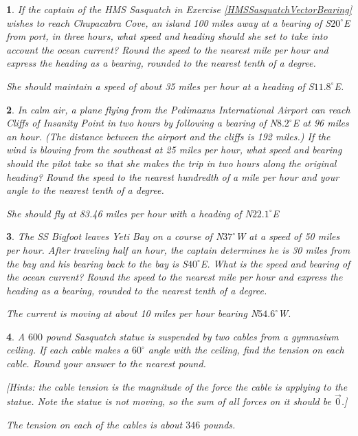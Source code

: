 \documentclass{amsbook}
\newtheorem{exc}{}
\newenvironment{ex}{\begin{exc}\normalfont}{\end{exc}}
\numberwithin{section}{chapter}
\numberwithin{equation}{chapter}
\begin{document}
\begin{ex}
	If the captain of the HMS Sasquatch in Exercise \ref{HMSSasquatchVectorBearing} wishes to reach Chupacabra Cove, an island 100 miles away at a bearing of  S$20^{\circ}$E from port, in three hours, what speed and heading should she set to take into account the ocean current?   Round the speed to the nearest mile per hour and express the heading as a bearing, rounded to the nearest tenth of a degree.  
	\begin{sol}
		She should maintain a speed of about 35 miles per hour at a heading of S$11.8^{\circ}$E.
	\end{sol}
\end{ex}

\begin{ex}
	In calm air, a plane flying from the Pedimaxus International Airport can reach Cliffs of Insanity Point in two hours by following a bearing of N$8.2^{\circ}$E at 96 miles an hour.  (The distance between the airport and the cliffs is 192 miles.)  If the wind is blowing from the southeast at 25 miles per hour, what speed and bearing should the pilot take so that she makes the trip in two hours along the original heading?  Round the speed to the nearest hundredth of a mile per hour and your angle to the nearest tenth of a degree.
	\begin{sol}
		She should fly at 83.46 miles per hour with a heading of N$22.1^{\circ}$E
	\end{sol}
\end{ex}

\begin{ex}
	The SS Bigfoot leaves Yeti Bay on a course of N$37^{\circ}$W at a speed of 50 miles per hour.  After traveling half an hour, the captain determines he is 30 miles from the bay and his bearing back to the bay is S$40^{\circ}$E.  What is the speed and bearing of the ocean current?  Round the speed to the nearest mile per hour and express the heading as a bearing, rounded to the nearest tenth of a degree.
	\begin{sol}
		The current is moving at about 10 miles per hour bearing N$54.6^{\circ}$W.
	\end{sol}
\end{ex}

\begin{ex}
	A $600$ pound Sasquatch statue is suspended by two cables from a gymnasium ceiling.  If  each cable makes a $60^{\circ}$ angle with the ceiling, find the tension on each cable.  Round your answer to the nearest pound.
	
	[Hints: the cable tension is the magnitude of the force the cable is applying to the statue. Note the statue is not moving, so the sum of all forces on it should be $\vec{0}$.]
	\begin{sol}
		The tension on each of the cables is about $346$ pounds.
	\end{sol}
\end{ex}
\end{document}
